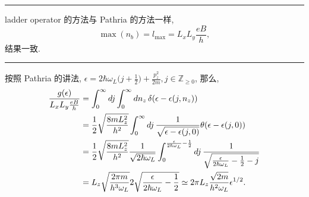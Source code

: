 \begin{itemize}
\begin{tcolorbox}[title=caculation:]
		\noindent\rule[0.5ex]{\linewidth}{0.5pt} %
		
		ladder operator 的方法与 Pathria 的方法一样,
		\begin{equation}
			\max(n_b) = l_\text{max} = L_x L_y \frac{e B}{h},
		\end{equation}
		结果一致.
		
		\noindent\rule[0.5ex]{\linewidth}{0.5pt} %
		
		按照 Pathria 的讲法, $\epsilon = 2 \hbar \omega_L \big( j + \frac{1}{2} \big) + \frac{p_z^2}{2 m}, j \in \mathbb{Z}_{\geq 0}$, 那么,
		\begin{align}
			\frac{g(\epsilon)}{L_x L_y \frac{e B}{h}} &= \int_0^\infty dj \int_0^\infty dn_z \, \delta(\epsilon - \epsilon(j, n_z)) \notag \\
			&= \frac{1}{2} \sqrt{\frac{8 m L_z^2}{h^2}} \int_0^\infty dj \, \frac{1}{\sqrt{\epsilon - \epsilon(j, 0)}} \theta(\epsilon - \epsilon(j, 0)) \notag \\
			&= \frac{1}{2} \sqrt{\frac{8 m L_z^2}{h^2}} \frac{1}{\sqrt{2 \hbar \omega_L}} \int_0^{\frac{\epsilon}{2 \hbar \omega_L} - \frac{1}{2}} dj \, \frac{1}{\sqrt{\frac{\epsilon}{2 \hbar \omega_L} - \frac{1}{2} - j}} \notag \\
			&= L_z \sqrt{\frac{2 \pi m}{h^3 \omega_L}} 2 \sqrt{\frac{\epsilon}{2 \hbar \omega_L} - \frac{1}{2}} \simeq 2 \pi L_z \frac{\sqrt{2 m}}{h^2 \omega_L} \epsilon^{1 / 2}.
		\end{align}
	\end{tcolorbox}
\end{itemize}
